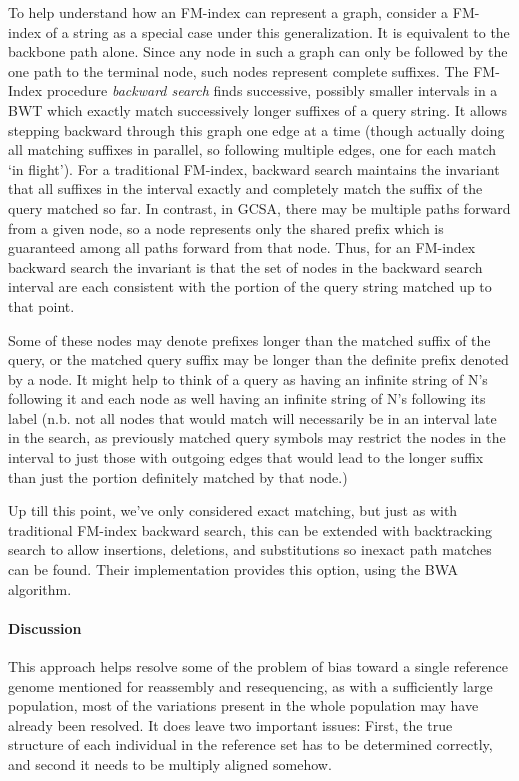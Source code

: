 To help understand how an FM-index can represent a graph, consider a FM-index of a string as a special case under this generalization.
It is equivalent to the backbone path alone.
Since any node in such a graph can only be followed by the one path to the terminal node, such nodes represent complete suffixes.
The FM-Index procedure \emph{backward search} finds successive, possibly smaller intervals in a BWT which exactly match successively longer suffixes of a query string. It allows stepping backward through this graph one edge at a time (though actually doing all matching suffixes in parallel, so following multiple edges, one for each match `in flight'). %
For a traditional FM-index, backward search maintains the invariant that all suffixes in the interval exactly and completely match the suffix of the query matched so far.
In contrast, in GCSA, there may be multiple paths forward from a given node, so a node represents only the shared prefix which is guaranteed among all paths forward from that node.
Thus, for an FM-index backward search  the invariant is that the set of nodes in the backward search interval are each consistent with the portion of the query string matched up to that point.  

Some of these nodes may denote prefixes longer than the matched suffix of the query, or the matched query suffix may be longer than the definite prefix denoted by a node.
It might help to think of a query as having an infinite string of N's following it and each node as well having an infinite string of N's following its label (n.b. not all nodes that would match will necessarily be in an interval late in the search, as previously matched query symbols may restrict the nodes in the interval to just those with outgoing edges that would lead to the longer suffix than just the portion definitely matched by that node.) 

Up till this point, we've only considered exact matching, but just as with traditional FM-index backward search, this can be extended with backtracking search to allow insertions, deletions, and substitutions so inexact path matches can be found.
Their implementation provides this option, using the BWA algorithm.%

\paragraph{Discussion}

This approach helps resolve some of the problem of bias toward a single reference genome mentioned for reassembly and resequencing, as with a sufficiently large population, most of the variations present in the whole population may have already been resolved.  It does leave two important issues: First, the true structure of each individual in the reference set has to be determined correctly, and second it needs to be multiply aligned somehow.  

